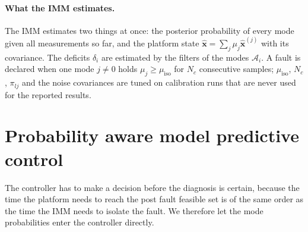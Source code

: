 \documentclass[10pt]{article}
\newcommand{\vc}[1]{\bm{#1}}
\begin{document}
\paragraph{What the IMM estimates.} The IMM estimates two things at once: the posterior probability of every mode given all measurements so far, and the platform state $\hat{\vc x}=\sum_j\mu_j\hat{\vc x}^{(j)}$ with its covariance. The deficits $\delta_i$ are estimated by the filters of the modes $\mathcal A_i$. A fault is declared when one mode $j\neq0$ holds $\mu_j\ge\mu_{\mathrm{iso}}$ for $N_c$ consecutive samples; $\mu_{\mathrm{iso}}$, $N_c$, $\pi_{lj}$ and the noise covariances are tuned on calibration runs that are never used for the reported results.

\section{Probability aware model predictive control}\label{sec:mpc}

The controller has to make a decision before the diagnosis is certain, because the time the platform needs to reach the post fault feasible set is of the same order as the time the IMM needs to isolate the fault. We therefore let the mode probabilities enter the controller directly.
\end{document}
